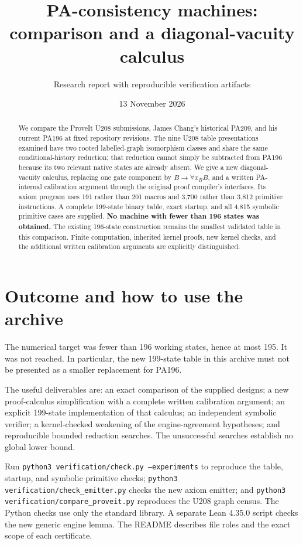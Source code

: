 \documentclass[11pt,letterpaper]{article}
\title{PA-consistency machines:\\comparison and a diagonal-vacuity calculus}
\author{Research report with reproducible verification artifacts}
\date{13 November 2026}
\begin{document}
\maketitle
\begin{abstract}
We compare the ProveIt U208 submissions, James Chang's historical PA209, and his current PA196 at fixed repository revisions. The nine U208 table presentations examined have two rooted labelled-graph isomorphism classes and share the same conditional-history reduction; that reduction cannot simply be subtracted from PA196 because its two relevant native states are already absent. We give a new diagonal-vacuity calculus, replacing one gate component by \(B\to\forall x_B B\), and a written PA-internal calibration argument through the original proof compiler's interfaces. Its axiom program uses 191 rather than 201 macros and 3,700 rather than 3,812 primitive instructions. A complete 199-state binary table, exact startup, and all 4,815 symbolic primitive cases are supplied. \textbf{No machine with fewer than 196 states was obtained.} The existing 196-state construction remains the smallest validated table in this comparison. Finite computation, inherited kernel proofs, new kernel checks, and the additional written calibration arguments are explicitly distinguished.
\end{abstract}
\clearpage
\tableofcontents
\clearpage
\section{Outcome and how to use the archive}
The numerical target was fewer than 196 working states, hence at most 195. It was not reached. In particular, the new 199-state table in this archive must not be presented as a smaller replacement for PA196.

The useful deliverables are: an exact comparison of the supplied designs; a new proof-calculus simplification with a complete written calibration argument; an explicit 199-state implementation of that calculus; an independent symbolic verifier; a kernel-checked weakening of the engine-agreement hypotheses; and reproducible bounded reduction searches. The unsuccessful searches establish no global lower bound.

Run \texttt{python3 verification/check.py --experiments} to reproduce the table, startup, and symbolic primitive checks; \texttt{python3 verification/check\_emitter.py} checks the new axiom emitter; and \texttt{python3 verification/compare\_proveit.py} reproduces the U208 graph census. The Python checks use only the standard library. A separate Lean 4.35.0 script checks the new generic engine lemma. The README describes file roles and the exact scope of each certificate.
\end{document}

